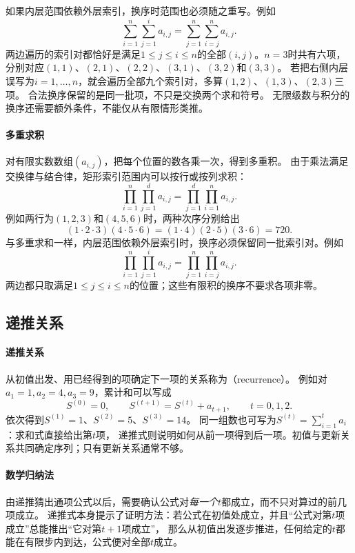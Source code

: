 如果内层范围依赖外层索引，换序时范围也必须随之重写。例如
\begin{equation}
  \sum_{i=1}^{n}\sum_{j=1}^{i}a_{i,j}
  =
  \sum_{j=1}^{n}\sum_{i=j}^{n}a_{i,j}.
  \label{eq:prelim-triangular-sum}
\end{equation}
两边遍历的索引对都恰好是满足$1\leq j\leq i\leq n$的全部$(i,j)$。$n=3$时共有六项，
分别对应$(1,1)$、$(2,1)$、$(2,2)$、$(3,1)$、$(3,2)$和$(3,3)$。
若把右侧内层误写为$i=1,\ldots,n$，就会遍历全部九个索引对，多算$(1,2)$、$(1,3)$、$(2,3)$三项。
合法换序保留的是同一批项，不只是交换两个求和符号。
无限级数与积分的换序还需要额外条件，不能仅从有限情形类推。

\paragraph{多重求积}
对有限实数数组$(a_{i,j})$，把每个位置的数各乘一次，得到多重积。
由于乘法满足交换律与结合律，矩形索引范围内可以按行或按列求积：
\[
 \prod_{i=1}^n\prod_{j=1}^d a_{i,j}
 =\prod_{j=1}^d\prod_{i=1}^n a_{i,j}.
\]
例如两行为$(1,2,3)$和$(4,5,6)$时，两种次序分别给出
\[
 (1\cdot2\cdot3)(4\cdot5\cdot6)
 =(1\cdot4)(2\cdot5)(3\cdot6)=720.
\]
与多重求和一样，内层范围依赖外层索引时，换序必须保留同一批索引对。例如
\[
 \prod_{i=1}^n\prod_{j=1}^i a_{i,j}
 =\prod_{j=1}^n\prod_{i=j}^n a_{i,j}.
\]
两边都只取满足$1\leq j\leq i\leq n$的位置；这些有限积的换序不要求各项非零。

\subsection{递推关系}
\label{sec:prelim-recurrence-unrolling}

\paragraph{递推关系}
从初值出发、用已经得到的项确定下一项的关系称为（recurrence）。
例如对$a_1=1,a_2=4,a_3=9$，累计和可以写成
\[
 S^{(0)}=0,\qquad S^{(t+1)}=S^{(t)}+a_{t+1},\qquad t=0,1,2.
\]
依次得到$S^{(1)}=1$、$S^{(2)}=5$、$S^{(3)}=14$。
同一组数也可写为$S^{(t)}=\sum_{i=1}^t a_i$：求和式直接给出第$t$项，
递推式则说明如何从前一项得到后一项。初值与更新关系共同确定序列；只有更新关系通常不够。

\paragraph{数学归纳法}
由递推猜出通项公式以后，需要确认公式对\emph{每一个}$t$都成立，而不只对算过的前几项成立。
递推式本身提示了证明方法：若公式在初值处成立，并且“公式对第$t$项成立”总能推出“它对第$t+1$项成立”，
那么从初值出发逐步推进，任何给定的$t$都能在有限步内到达，公式便对全部$t$成立。

